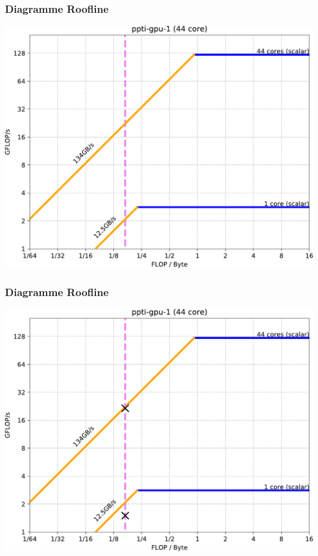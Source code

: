 \documentclass[xcolor={x11names,svgnames}, 14pt]{beamer}
\begin{document}
\begin{frame}
  \frametitle{Diagramme \og Roofline\fg{}}
  \centering
  \includegraphics[width=\textwidth]{roofline_ppti.pdf}
\end{frame}



\begin{frame}
  \frametitle{Diagramme \og Roofline\fg{}}
  \centering
  \includegraphics[width=\textwidth]{roofline_ppti2.pdf}
\end{frame}

\end{document}
